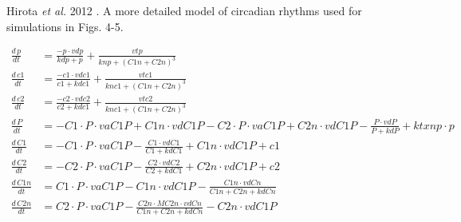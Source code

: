 \documentclass[11pt, letterpaper]{article}
\begin{document}
\begin{model}
\caption{Hirota {\itshape et al.} 2012 \cite{Hirota2012}. A more detailed model
of circadian rhythms used for simulations in Figs. 4-5.}
  \centering
\begin{align*}
\frac{d\,\mathit{p}}{dt} &= \frac{- \mathit{p} \cdot \mathit{vdp}}{\mathit{kdp} + \mathit{p}} + \frac{\mathit{vtp}}{\mathit{knp} + \left(\mathit{C1n} + \mathit{C2n}\right)^{3}}\\
\frac{d\,\mathit{c1}}{dt} &= \frac{- \mathit{c1} \cdot \mathit{vdc1}}{\mathit{c1} + \mathit{kdc1}} + \frac{\mathit{vtc1}}{\mathit{knc1} + \left(\mathit{C1n} + \mathit{C2n}\right)^{3}}\\
\frac{d\,\mathit{c2}}{dt} &= \frac{- \mathit{c2} \cdot \mathit{vdc2}}{\mathit{c2} + \mathit{kdc1}} + \frac{\mathit{vtc2}}{\mathit{knc1} + \left(\mathit{C1n} + \mathit{C2n}\right)^{3}}\\
\frac{d\,\mathit{P}}{dt} &= - \mathit{C1} \cdot \mathit{P} \cdot \mathit{vaC1P} + \mathit{C1n} \cdot \mathit{vdC1P} - \mathit{C2} \cdot \mathit{P} \cdot \mathit{vaC1P} + \mathit{C2n} \cdot \mathit{vdC1P} - \frac{\mathit{P} \cdot \mathit{vdP}}{\mathit{P} + \mathit{kdP}} + \mathit{ktxnp} \cdot \mathit{p}\\
\frac{d\,\mathit{C1}}{dt} &= - \mathit{C1} \cdot \mathit{P} \cdot \mathit{vaC1P} - \frac{\mathit{C1} \cdot \mathit{vdC1}}{\mathit{C1} + \mathit{kdC1}} + \mathit{C1n} \cdot \mathit{vdC1P} + \mathit{c1}\\
\frac{d\,\mathit{C2}}{dt} &= - \mathit{C2} \cdot \mathit{P} \cdot \mathit{vaC1P} - \frac{\mathit{C2} \cdot \mathit{vdC2}}{\mathit{C2} + \mathit{kdC1}} + \mathit{C2n} \cdot \mathit{vdC1P} + \mathit{c2}\\
\frac{d\,\mathit{C1n}}{dt} &= \mathit{C1} \cdot \mathit{P} \cdot \mathit{vaC1P} - \mathit{C1n} \cdot \mathit{vdC1P} - \frac{\mathit{C1n} \cdot \mathit{vdCn}}{\mathit{C1n} + \mathit{C2n} + \mathit{kdCn}}\\
\frac{d\,\mathit{C2n}}{dt} &= \mathit{C2} \cdot \mathit{P} \cdot \mathit{vaC1P} - \frac{\mathit{C2n} \cdot \mathit{MC2n} \cdot \mathit{vdCn}}{\mathit{C1n} + \mathit{C2n} + \mathit{kdCn}} - \mathit{C2n} \cdot \mathit{vdC1P}\\
\end{align*}



\end{model}
\end{document}
